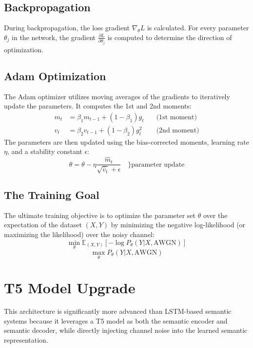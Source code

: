 \documentclass[twocolumn]{article}
\begin{document}
\subsection{\textbf{Backpropagation}}
During backpropagation, the loss gradient $\nabla_\theta L$ is calculated. For every parameter $\theta_j$ in the network, the gradient $\frac{\partial L}{\partial \theta_j}$ is computed to determine the direction of optimization.

\subsection{\textbf{Adam Optimization}}
The Adam optimizer utilizes moving averages of the gradients to iteratively update the parameters. It computes the 1st and 2nd moments:
\begin{align}
    m_t &= \beta_1 m_{t-1} + (1-\beta_1)g_t \quad &\text{(1st moment)} \\
    v_t &= \beta_2 v_{t-1} + (1-\beta_2)g_t^2 \quad &\text{(2nd moment)} 
\end{align}
The parameters are then updated using the bias-corrected moments, learning rate $\eta$, and a stability constant $\epsilon$:
\begin{equation}
    \theta = \theta - \eta \frac{\hat{m}_t}{\sqrt{\hat{v}_t} + \epsilon} \quad \text{\} parameter update}
\end{equation}

\subsection{\textbf{The Training Goal}}
The ultimate training objective is to optimize the parameter set $\theta$ over the expectation of the dataset $(X,Y)$ by minimizing the negative log-likelihood (or maximizing the likelihood) over the noisy channel:
\begin{equation}
    \min_\theta \mathbb{E}_{(X,Y)} [-\log P_\theta(Y|X, \text{AWGN})]
\end{equation}
\begin{equation}
    \max_\theta P_\theta(Y|X, \text{AWGN})
\end{equation}


\section{\large \textbf{T5 Model Upgrade}}
This architecture is significantly more advanced than LSTM-based semantic systems because it leverages a T5 model as both the semantic encoder and semantic decoder, while directly injecting channel noise into the learned semantic representation. 
\end{document}
